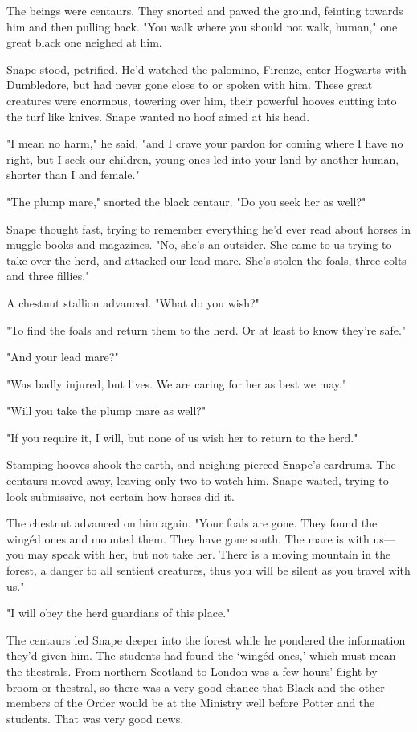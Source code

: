 The beings were centaurs. They snorted and pawed the ground, feinting towards him and then pulling back. "You walk where you should not walk, human," one great black one neighed at him.

Snape stood, petrified. He'd watched the palomino, Firenze, enter Hogwarts with Dumbledore, but had never gone close to or spoken with him. These great creatures were enormous, towering over him, their powerful hooves cutting into the turf like knives. Snape wanted no hoof aimed at his head.

"I mean no harm," he said, "and I crave your pardon for coming where I have no right, but I seek our children, young ones led into your land by another human, shorter than I and female."

"The plump mare," snorted the black centaur. "Do you seek her as well?"

Snape thought fast, trying to remember everything he'd ever read about horses in muggle books and magazines. "No, she's an outsider. She came to us trying to take over the herd, and attacked our lead mare. She's stolen the foals, three colts and three fillies."

A chestnut stallion advanced. "What do you wish?"

"To find the foals and return them to the herd. Or at least to know they're safe."

"And your lead mare?"

"Was badly injured, but lives. We are caring for her as best we may."

"Will you take the plump mare as well?"

"If you require it, I will, but none of us wish her to return to the herd."

Stamping hooves shook the earth, and neighing pierced Snape's eardrums. The centaurs moved away, leaving only two to watch him. Snape waited, trying to look submissive, not certain how horses did it.

The chestnut advanced on him again. "Your foals are gone. They found the wingéd ones and mounted them. They have gone south. The mare is with us—you may speak with her, but not take her. There is a moving mountain in the forest, a danger to all sentient creatures, thus you will be silent as you travel with us."

"I will obey the herd guardians of this place."

The centaurs led Snape deeper into the forest while he pondered the information they'd given him. The students had found the `wingéd ones,' which must mean the thestrals. From northern Scotland to London was a few hours' flight by broom or thestral, so there was a very good chance that Black and the other members of the Order would be at the Ministry well before Potter and the students. That was very good news.

